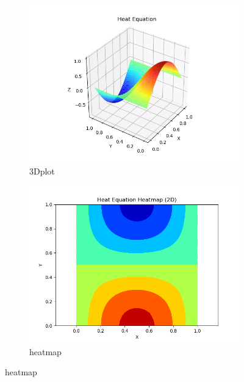 \begin{figure}[H]
    \centering  
    \begin{subfigure}{0.5\textwidth}  
        \centering  
        \includegraphics[width=0.9\linewidth]{./pics/final/spacetime/regular/regularmine3D.png}  
        \caption{3Dplot}  
    \end{subfigure}%
    \begin{subfigure}{0.5\textwidth}  
        \centering  
        \includegraphics[width=0.9\linewidth]{./pics/final/spacetime/regular/regularmineheat.png}  
        \caption{heatmap}
    \end{subfigure}  


\end{figure}
